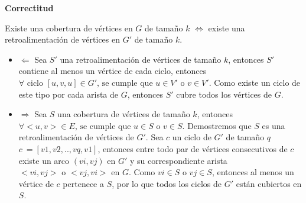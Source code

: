 \documentclass{article}
\begin{document}

\textbf{Correctitud}

Existe una cobertura de vértices en \( G \) de tamaño \(k\) \(\iff\) existe una retroalimentación de vértices en \( G' \) de tamaño \(k\).

\begin{itemize}

\item \(\Leftarrow\)
 Sea \(S'\) una retroalimentación de vértices de tamaño \(k\), entonces \(S'\) contiene al menos un vértice de cada ciclo, entonces \(\forall \text{ ciclo } [u,v,u] \in G' \text{, se cumple que } u \in V' \text{ o } v \in V'\). Como existe un ciclo de este tipo por cada arista de \(G\), entonces \(S'\) cubre todos los vértices de \(G\).

\item \(\Rightarrow\)
Sea \(S\) una cobertura de vértices de tamaño \(k\), entonces \(\forall <u,v> \in E \text{, se cumple que } u \in S \text{ o } v \in S\). Demostremos que \(S\) es una retroalimentación de vértices de \(G'\). Sea \(c\) un ciclo de \(G'\) de tamaño \(q\) \(c\ = [v1,v2,..,vq,v1]\), entonces entre todo par de vértices consecutivos de \(c\) existe un arco \( (vi,vj)\) en \(G'\) y su correspondiente arista \( <vi,vj> \text{ o } <vj,vi> \text{ en } G\). Como \(vi \in S \text{ o }vj \in S\), entonces al menos un vértice de \(c\) pertenece a \(S\), por lo que todos los ciclos de \(G'\) están cubiertos en \(S\).

\end{itemize}
\end{document}
